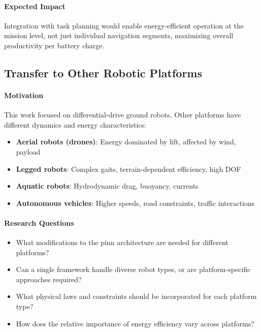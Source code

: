 \paragraph{Expected Impact}
Integration with task planning would enable energy-efficient operation at the mission level, not just individual navigation segments, maximizing overall productivity per battery charge.

\subsection{Transfer to Other Robotic Platforms}

\paragraph{Motivation}
This work focused on differential-drive ground robots. Other platforms have different dynamics and energy characteristics:
\begin{itemize}
    \item \textbf{Aerial robots (drones)}: Energy dominated by lift, affected by wind, payload
    \item \textbf{Legged robots}: Complex gaits, terrain-dependent efficiency, high DOF
    \item \textbf{Aquatic robots}: Hydrodynamic drag, buoyancy, currents
    \item \textbf{Autonomous vehicles}: Higher speeds, road constraints, traffic interactions
\end{itemize}

\paragraph{Research Questions}
\begin{itemize}
    \item What modifications to the \acrshort{pinn} architecture are needed for different platforms?
    \item Can a single framework handle diverse robot types, or are platform-specific approaches required?
    \item What physical laws and constraints should be incorporated for each platform type?
    \item How does the relative importance of energy efficiency vary across platforms?
\end{itemize}

